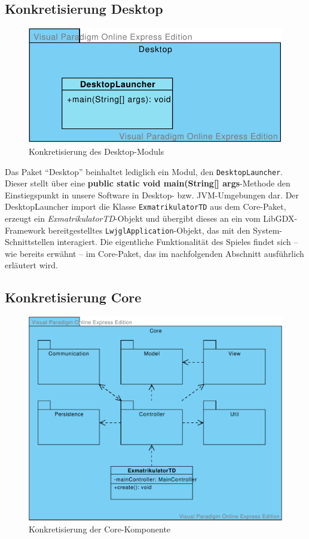 \documentclass[enabledeprecatedfontcommands,fontsize=12pt,paper=a4,twoside,parskip=half]{scrartcl}
\begin{document}
\subsection{Konkretisierung Desktop}

\label{subsec:desktop}

\begin{figure}[H]
    \centering
    \includegraphics[width=.5\textwidth]{Bilder/Desktop-Modul.pdf}
    \caption{Konkretisierung des Desktop-Moduls}
    \label{fig:desktopModul}
\end{figure}

Das Paket \enquote{Desktop} beinhaltet lediglich ein Modul, den \texttt{DesktopLauncher}. Dieser stellt über eine \textbf{public static void main(String[] args}-Methode den Einstiegspunkt in unsere Software in Desktop- bzw. JVM-Umgebungen dar. Der DesktopLauncher import die Klasse \texttt{ExmatrikulatorTD} aus dem Core-Paket, erzeugt ein \textit{ExmatrikulatorTD}-Objekt und übergibt dieses an ein vom LibGDX-Framework bereitgestelltes \texttt{LwjglApplication}-Objekt, das mit den System-Schnittstellen interagiert. Die eigentliche Funktionalität des Spieles findet sich -- wie bereits erwähnt -- im Core-Paket, das im nachfolgenden Abschnitt ausführlich erläutert wird.

\subsection{Konkretisierung Core}
\label{subsec:core}

\begin{figure}[ht]
    \centering
    \includegraphics[width=.75\textwidth]{Bilder/CorePaket.pdf}
    \caption{Konkretisierung der Core-Komponente}
    \label{fig:coreModul}
\end{figure}
\end{document}
